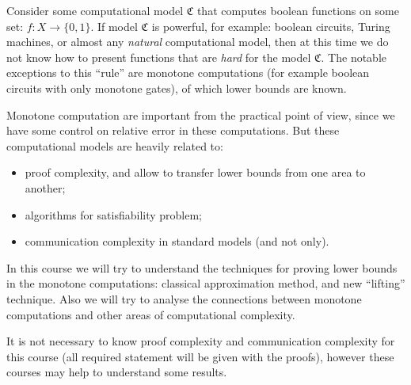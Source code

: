 Consider some computational model $\mathfrak{C}$ that computes boolean functions on some set: $f\colon X
\to \{0, 1\}$. If model $\mathfrak{C}$ is powerful, for example: boolean circuits, Turing machines, or
almost any \emph{natural} computational model, then at this time we do not know how to present functions
that are \emph{hard} for the model $\mathfrak{C}$. The notable exceptions to this ``rule'' are monotone
computations (for example boolean circuits with only monotone gates), of which lower bounds are known.

Monotone computation are important from the practical point of view, since we have some control on relative
error in these computations. But these computational models are heavily related to:
\begin{itemize}
    \item proof complexity, and allow to transfer lower bounds from one area to another;
    \item algorithms for satisfiability problem;
    \item communication complexity in standard models (and not only).
\end{itemize}

In this course we will try to understand the techniques for proving lower bounds in the monotone
computations: classical approximation method, and new ``lifting'' technique. Also we will try to analyse
the connections between monotone computations and other areas of computational complexity.


It is not necessary to know proof complexity and communication complexity for this course (all required
statement will be given with the proofs), however these courses may help to understand some results.